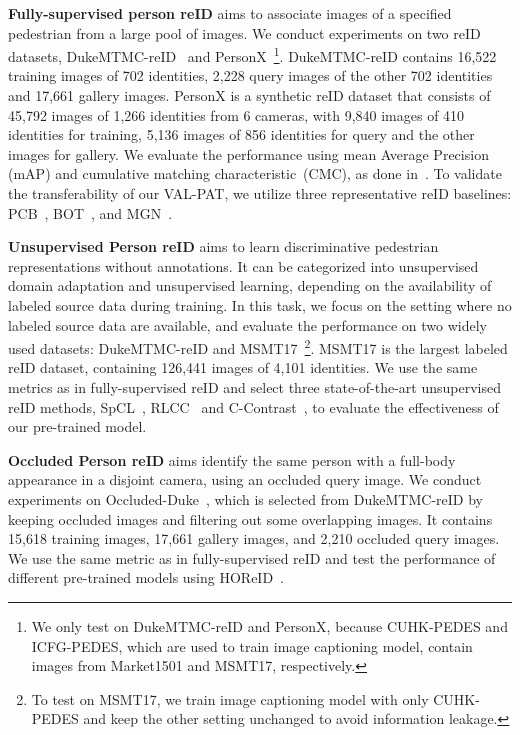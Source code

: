 \documentclass[final]{cvpr}
\begin{document}
\noindent
\textbf{Fully-supervised person reID} aims to associate images of a specified pedestrian from a large pool of images.
We conduct experiments on two reID datasets, DukeMTMC-reID~\cite{Ristani2016PerformanceMA} and PersonX~\cite{sun2019dissecting}\footnote{We only test on DukeMTMC-reID and PersonX, because CUHK-PEDES and ICFG-PEDES, which are used to train image captioning model, contain images from Market1501 and MSMT17, respectively.}.
DukeMTMC-reID contains 16,522 training images of 702 identities, 2,228 query images of the other 702 identities and 17,661 gallery images.
PersonX is a synthetic reID dataset that consists of 45,792 images of 1,266 identities from 6 cameras, with 9,840 images of 410 identities for training, 5,136 images of 856 identities for query and the other images for gallery.
We evaluate the performance using mean Average Precision (mAP) and cumulative matching characteristic~(CMC), as done in~\cite{fu2021unsupervised}. 
To validate the transferability of our VAL-PAT, we utilize three representative reID baselines: PCB~\cite{sun2018beyond}, BOT~\cite{luo2019bag}, and MGN~\cite{wang2018learning}.







\noindent
\textbf{Unsupervised Person reID} aims to learn discriminative pedestrian representations without annotations.
It can be categorized into unsupervised domain adaptation and unsupervised learning, depending on the availability of labeled source data during training. 
In this task, we focus on the setting where no labeled source data are available, and evaluate the performance on two widely used datasets: DukeMTMC-reID and MSMT17~\cite{wei2018person}\footnote{To test on MSMT17, we train image captioning model with only CUHK-PEDES and keep the other setting unchanged to avoid information leakage.}.
MSMT17 is the largest labeled reID dataset, containing 126,441 images of 4,101 identities.
We use the same metrics as in fully-supervised reID and select three state-of-the-art unsupervised reID methods, SpCL~\cite{ge2020self}, RLCC~\cite{zhang2021refining} and C-Contrast~\cite{dai2022cluster}, to evaluate the effectiveness of our pre-trained model.

\noindent
\textbf{Occluded Person reID} aims identify the same person with a full-body appearance in a disjoint camera, using an occluded query image.
We conduct experiments on Occluded-Duke~\cite{miao2019pose}, which is selected from DukeMTMC-reID by keeping occluded images and filtering out some overlapping images. 
It contains 15,618 training images, 17,661 gallery images, and 2,210 occluded query images.
We use the same metric as in fully-supervised reID and test the performance of different pre-trained models using HOReID~\cite{wang2020high}.
\end{document}
